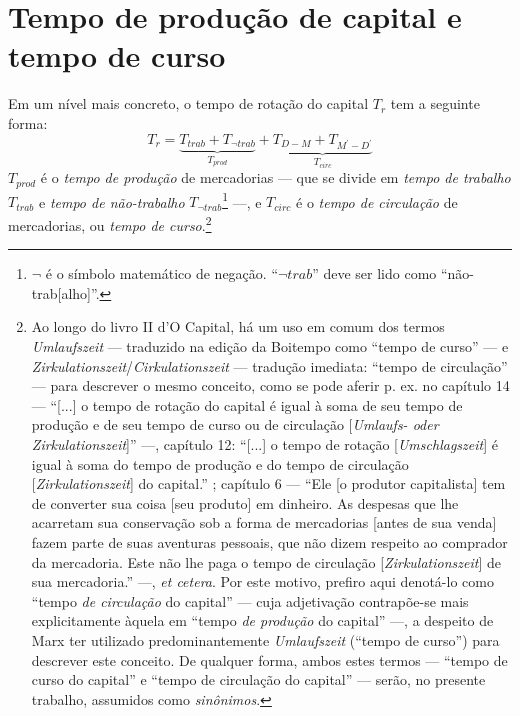 \section{Tempo de produção de capital e tempo de curso}
Em um nível mais concreto, o tempo de rotação do capital $T_r$ tem a seguinte forma:
$$
T_r = \underbrace{ T_{trab} + T_{\lnot trab} }_{ T_{prod} } + \underbrace{ T_{D-M} + T_{M^\prime-D^\prime} }_{ T_{circ} }
$$
$T_{prod}$ é o \textit{tempo de produção} de mercadorias --- que se divide em \textit{tempo de trabalho} $T_{trab}$ e \textit{tempo de não-trabalho} $T_{\lnot trab}$\footnote{$\lnot$ é o símbolo matemático de negação. ``$\lnot trab$'' deve ser lido como ``não-trab[alho]''.} ---, e $T_{circ}$ é o \textit{tempo de circulação} de mercadorias, ou \textit{tempo de curso}.\footnote{Ao longo do livro II d'O Capital, há um uso em comum dos termos \textit{Umlaufszeit} --- traduzido na edição da Boitempo \parencite{Marx2014} como ``tempo de curso'' --- e \textit{Zirkulationszeit}/\textit{Cirkulationszeit} --- tradução imediata: ``tempo de circulação'' --- para descrever o mesmo conceito, como se pode aferir p. ex. no capítulo 14 --- ``[...] o tempo de rotação do capital é igual à soma de seu tempo de produção e de seu tempo de curso ou de circulação [\textit{Umlaufs- oder Zirkulationszeit}]'' \parencite[p. 343]{Marx2014} ---, capítulo 12: ``[...] o tempo de rotação [\textit{Umschlagszeit}] é igual à soma do tempo de produção e do tempo de circulação [\textit{Zirkulationszeit}] do capital.'' \parencite[p. 323]{Marx2014}; capítulo 6 --- ``Ele [o produtor capitalista] tem de converter sua coisa [seu produto] em dinheiro. As despesas que lhe acarretam sua conservação sob a forma de mercadorias [antes de sua venda] fazem parte de suas aventuras pessoais, que não dizem respeito ao comprador da mercadoria. Este não lhe paga o tempo de circulação [\textit{Zirkulationszeit}] de sua mercadoria.'' \parencite[p. 225]{Marx2014} ---, \textit{et cetera}. Por este motivo, prefiro aqui denotá-lo como ``tempo \textit{de circulação} do capital'' --- cuja adjetivação contrapõe-se mais explicitamente àquela em ``tempo \textit{de produção} do capital'' ---, a despeito de Marx ter utilizado predominantemente \textit{Umlaufszeit} (``tempo de curso'') para descrever este conceito. De qualquer forma, ambos estes termos --- ``tempo de curso do capital'' e ``tempo de circulação do capital'' --- serão, no presente trabalho, assumidos como \textit{sinônimos}.} 

